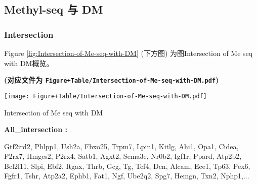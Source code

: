 \documentclass[
]{article}
\begin{document}
\begin{center}\vspace{1.5cm}\end{center}

\hypertarget{methyl-seq-ux4e0e-dm}{%
\subsection{Methyl-seq 与 DM}\label{methyl-seq-ux4e0e-dm}}

\hypertarget{intersection}{%
\subsubsection{Intersection}\label{intersection}}

\begin{center}\vspace{1.5cm}\end{center}

Figure \ref{fig:Intersection-of-Me-seq-with-DM} (下方图) 为图Intersection of Me seq with DM概览。

\textbf{(对应文件为 \texttt{Figure+Table/Intersection-of-Me-seq-with-DM.pdf})}

\def\@captype{figure}
\begin{center}
\texttt{[image: Figure+Table/Intersection-of-Me-seq-with-DM.pdf]}
\caption{Intersection of Me seq with DM}\label{fig:Intersection-of-Me-seq-with-DM}
\end{center}

\begin{center}\vspace{1.5cm}\end{center}\begin{center}\begin{tcolorbox}[colback=gray!10, colframe=gray!50, width=0.9\linewidth, arc=1mm, boxrule=0.5pt]
\textbf{
All\_intersection
:}

\vspace{0.5em}

    Gtf2ird2, Phlpp1, Ush2a, Fbxo25, Trpm7, Lpin1, Kitlg,
Ahi1, Opa1, Cidea, P2rx7, Hmgcs2, P2rx4, Satb1, Agxt2,
Sema3e, Nr0b2, Igf1r, Ppard, Atp2b2, Bcl2l11, Slpi, Ebf2,
Itgax, Thrb, Gcg, Tg, Tcf4, Dcn, Alcam, Ece1, Tp63, Pex6,
Fgfr1, Tshr, Atp2a2, Ephb1, Fat1, Ngf, Ube2q2, Spg7, Hemgn,
Txn2, Nphp1,...

\vspace{2em}
\end{tcolorbox}
\end{center}
\end{document}
